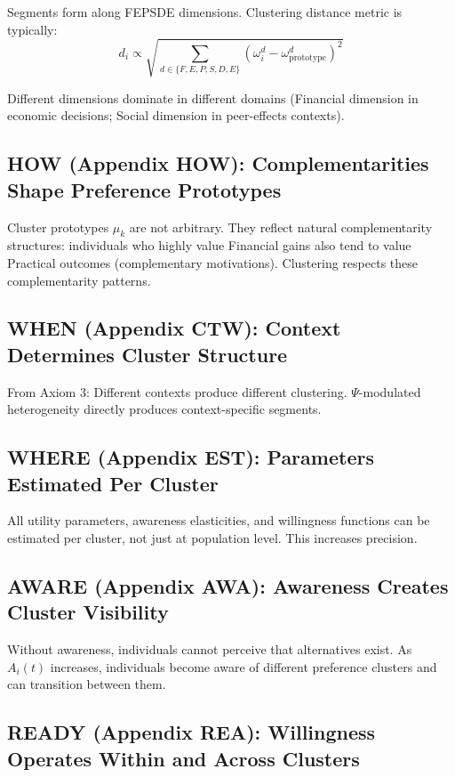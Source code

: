 Segments form along FEPSDE dimensions. Clustering distance metric is typically:
\begin{equation}
d_i \propto \sqrt{\sum_{d \in \{F,E,P,S,D,E\}} (\omega^d_i - \omega^d_{\text{prototype}})^2}
\end{equation}

Different dimensions dominate in different domains (Financial dimension in
economic decisions; Social dimension in peer-effects contexts).
\cite{fehr1999theory, fehr2002cooperation}

\subsection{HOW (Appendix HOW): Complementarities Shape Preference Prototypes}

Cluster prototypes $\mu_k$ are not arbitrary. They reflect natural complementarity
structures: individuals who highly value Financial gains also tend to value
Practical outcomes (complementary motivations). Clustering respects these
complementarity patterns.

\subsection{WHEN (Appendix CTW): Context Determines Cluster Structure}

From Axiom 3: Different contexts produce different clustering. $\Psi$-modulated
heterogeneity directly produces context-specific segments.

\subsection{WHERE (Appendix EST): Parameters Estimated Per Cluster}

All utility parameters, awareness elasticities, and willingness functions can
be estimated per cluster, not just at population level. This increases precision.

\subsection{AWARE (Appendix AWA): Awareness Creates Cluster Visibility}

Without awareness, individuals cannot perceive that alternatives exist. As
$A_i(t)$ increases, individuals become aware of different preference clusters
and can transition between them.

\subsection{READY (Appendix REA): Willingness Operates Within and Across Clusters}

